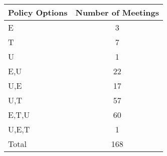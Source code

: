 \begin{tabular}{lc}
\hline\hline 
\addlinespace 
Policy Options & Number of Meetings \\ 
\hline 
E & 3 \\
T & 7 \\
U & 1 \\
E,U & 22 \\
U,E & 17 \\
U,T & 57 \\
E,T,U & 60 \\
U,E,T & 1 \\
\addlinespace 
Total & 168 \\
\hline 
\end{tabular}